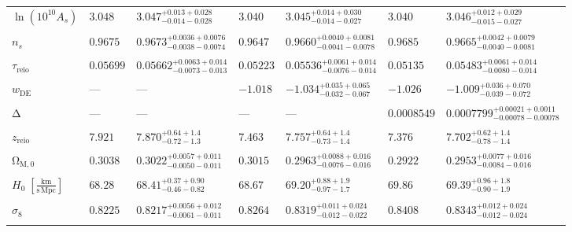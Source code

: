 \documentclass[11pt,twocolumn]{article}
\begin{document}
\begin{table*}[h!]
{\begin{tabular*}{\textwidth}{@{\extracolsep{\fill}}lllllll@{}}
    			$\ln (10^{10} A_s)$ & $3.048$ & $3.047^{+0.013+0.028}_{-0.014-0.028}$ & $3.040$ & $3.045^{+0.014+0.030}_{-0.014-0.027}$ & $3.040$ & $3.046^{+0.012+0.029}_{-0.015-0.027}$ \\
    			& & & & & & \\
    			$n_s$ & $0.9675$ & $0.9673^{+0.0036+0.0076}_{-0.0038-0.0074}$ & $0.9647$ & $0.9660^{+0.0040+0.0081}_{-0.0041-0.0078}$ & $0.9685$ & $0.9665^{+0.0042+0.0079}_{-0.0040-0.0081}$ \\
    			& & & & & & \\
    			$\tau_\mathrm{reio}$ & $0.05699$ & $0.05662^{+0.0063+0.014}_{-0.0073-0.013}$ & $0.05223$ & $0.05536^{+0.0061+0.014}_{-0.0076-0.014}$ & $0.05135$ & $0.05483^{+0.0061+0.014}_{-0.0080-0.014}$ \\
    			& & & & & & \\
    			$w_{\mathrm{DE}}$ & --- & --- & $-1.018$ & $-1.034^{+0.035+0.065}_{-0.032-0.067}$ & $-1.026$ & $-1.009^{+0.036+0.070}_{-0.039-0.072}$ \\
    			& & & & & & \\
    			$\mathrm{\Delta}$ & --- & --- & --- & --- & $0.0008549$ & $0.0007799^{+0.00021+0.0011}_{-0.00078-0.00078}$ \\
    			& & & & & & \\
    			$z_\mathrm{reio}$ & $7.921$ & $7.870^{+0.64+1.4}_{-0.72-1.3}$ & $7.463$ & $7.757^{+0.64+1.4}_{-0.73-1.4}$ & $7.376$ & $7.702^{+0.62+1.4}_{-0.78-1.4}$ \\
    			& & & & & & \\
    			$\mathrm{\Omega}_{\mathrm{M},0}$ & $0.3038$ & $0.3022^{+0.0057+0.011}_{-0.0050-0.011}$ & $0.3015$ & $0.2963^{+0.0088+0.016}_{-0.0076-0.016}$ & $0.2922$ & $0.2953^{+0.0077+0.016}_{-0.0084-0.016}$ \\
    			& & & & & & \\
    			$H_0\;[\mathrm{\frac{km}{s\,Mpc}}]$ & $68.28$ & $68.41^{+0.37+0.90}_{-0.46-0.82}$ & $68.67$ & $69.20^{+0.88+1.9}_{-0.97-1.7}$ & $69.86$ & $69.39^{+0.96+1.8}_{-0.90-1.9}$ \\
    			& & & & & & \\
    			$\sigma_8$ & $0.8225$ & $0.8217^{+0.0056+0.012}_{-0.0061-0.011}$ & $0.8264$ & $0.8319^{+0.011+0.024}_{-0.012-0.022}$ & $0.8408$ & $0.8343^{+0.012+0.024}_{-0.012-0.024}$ \\
    			& & & & & & \\
    			\cline{1-7}
    		\end{tabular*}
    	}
    \end{table*}
\end{document}
